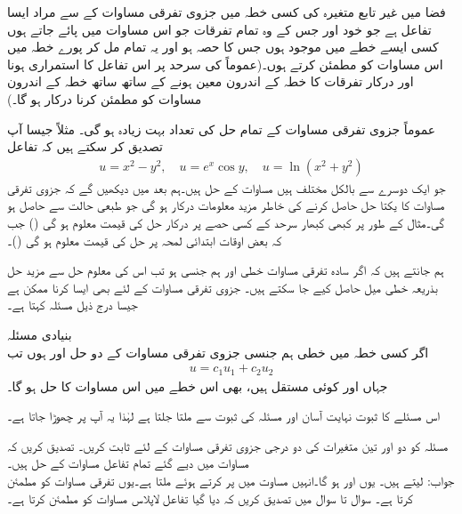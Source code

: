 فضا میں غیر تابع متغیرہ کی کسی خطہ   میں جزوی تفرقی مساوات کے  سے مراد ایسا تفاعل ہے جو خود اور جس کے وہ تمام تفرقات جو اس مساوات میں پائے جاتے ہوں کسی ایسے خطے میں موجود ہوں  جس کا  حصہ ہو اور یہ تمام مل کر پورے خطہ  میں اس مساوات کو مطمئن کرتے ہوں۔(عموماً  کی سرحد پر اس تفاعل کا استمراری ہونا اور درکار تفرقات کا خطہ کے اندرون معین ہونے کے ساتھ ساتھ خطہ کے اندرون مساوات کو مطمئن کرنا درکار ہو گا۔)

عموماً جزوی تفرقی مساوات کے تمام حل کی تعداد بہت زیادہ ہو گی۔ مثلاً جیسا آپ تصدیق کر سکتے ہیں کہ تفاعل
\begin{align}\label{مساوات_جزوی_مثال_تفاعل}
u=x^2-y^2,\quad u=e^x\cos y,\quad u=\ln(x^2+y^2)
\end{align} 
جو ایک دوسرے سے بالکل مختلف ہیں مساوات  کے حل ہیں۔ہم بعد میں دیکھیں گے کہ جزوی تفرقی مساوات کا یکتا حل حاصل کرنے کی خاطر مزید معلومات درکار ہو گی جو طبعی حالت سے حاصل ہو گی۔مثال کے طور پر کبھی کبھار سرحد کے کسی حصے پر درکار حل کی قیمت معلوم ہو گی () جب کہ بعض اوقات ابتدائی لمحہ  پر حل کی قیمت معلوم ہو گی ()۔ 

ہم جانتے ہیں کہ اگر سادہ تفرقی مساوات خطی اور ہم جنسی ہو تب اس کی معلوم حل سے مزید حل بذریعہ خطی میل حاصل کیے جا سکتے ہیں۔ جزوی تفرقی مساوات کے لئے بھی ایسا کرنا ممکن ہے جیسا درج ذیل مسئلہ کہتا ہے۔

\quad بنیادی مسئلہ\\
اگر کسی خطہ  میں  خطی ہم جنسی جزوی تفرقی مساوات کے دو حل  اور  ہوں تب
\begin{align*}
u=c_1u_1+c_2u_2
\end{align*} 
جہاں  اور  کوئی مستقل ہیں، بھی اس خطے میں اس مساوات کا حل ہو گا۔

اس مسئلے کا ثبوت نہایت آسان اور مسئلہ  کی ثبوت سے ملتا جلتا ہے لہٰذا یہ آپ پر چھوڑا جاتا ہے۔


\quad
مسئلہ  کو دو اور تین متغیرات کی دو درجی جزوی تفرقی مساوات کے لئے ثابت کریں۔
\quad تصدیق کریں کہ مساوات  میں دیے گئے تمام تفاعل مساوات  کے حل ہیں۔\\
جواب:\quad {} لیتے ہیں۔ یوں  اور  ہو گا۔انہیں مساوت  میں پر کرتے ہوئے  ملتا ہے۔یوں  تفرقی مساوات کو مطمئن کرتا ہے۔
سوال  تا سوال  میں تصدیق کریں کہ دیا گیا تفاعل لاپلاس مساوات کو مطمئن کرتا ہے۔

